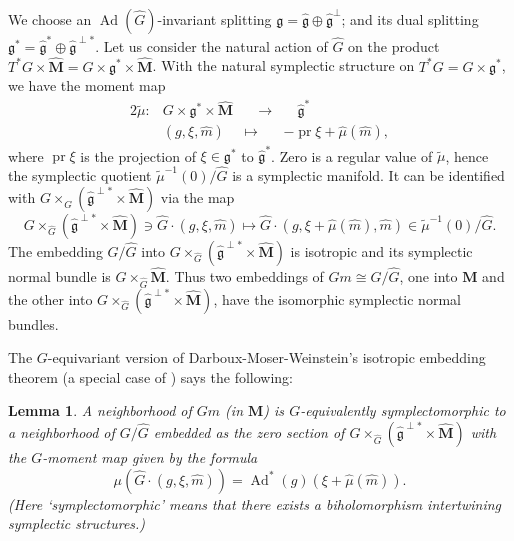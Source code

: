 \documentclass[12pt]{amsart}
\newcommand{\rom}{\textup}
\newtheorem{Lemma}[equation]{Lemma}
\theoremstyle{definition}
\theoremstyle{remark}
\numberwithin{equation}{subsection}
\newcommand{\bM}{{\mathbf M}} %
\begin{document}
We choose an $\operatorname{Ad}(\widehat G)$-invariant splitting
$\mathfrak g = \widehat{\mathfrak g}\oplus
\widehat{\mathfrak g}^\perp$; and its dual splitting 
$\mathfrak g^* = \widehat{\mathfrak g}^*\oplus
\widehat{\mathfrak g}^{\perp*}$.
Let us consider the natural action of $\widehat G$ on the product
$T^*G\times\widehat\bM = G\times\mathfrak g^*\times\widehat\bM$.
%
With the natural symplectic structure on $T^*G = G\times\mathfrak
g^*$, we have the moment map
\begin{alignat*}{2}
  \widetilde\mu\colon & G\times\mathfrak g^*\times\widehat\bM &\quad
   \to &\quad \widehat{\mathfrak g}^* \\
  & (g,\xi,\widehat m) & \mapsto &
   -\operatorname{pr}\xi + \widehat\mu(\widehat m),
\end{alignat*}
where $\operatorname{pr}\xi$ is the projection of
$\xi\in\mathfrak g^*$ to $\widehat{\mathfrak g}^*$.
%
Zero is a regular value of $\widetilde\mu$, hence the symplectic quotient
$\widetilde\mu^{-1}(0)/\widehat G$ is a symplectic manifold. It can be
identified with
\(
   G\times_{\widehat G} \left(
     \widehat{\mathfrak g}^{\perp*}\times \widehat\bM \right)
\)
via the map
\begin{equation*}
  G\times_{\widehat G} \left(
     \widehat{\mathfrak g}^{\perp*}\times \widehat\bM \right) \ni
   \widehat G\cdot(g,\xi, \widehat m)
     \longmapsto
   \widehat G\cdot(g,\xi+\widehat\mu(\widehat m),\widehat m)
   \in \widetilde\mu^{-1}(0)/\widehat G.
\end{equation*}
The embedding $G/\widehat G$ into
\(
   G\times_{\widehat G} \left(
     \widehat{\mathfrak g}^{\perp*}\times \widehat\bM \right)
\)
is isotropic and its symplectic normal bundle is $G\times_{\widehat
G}\widehat\bM$. Thus two embeddings of $Gm\cong G/\widehat G$, one
into $\bM$ and the other into
\(
   G\times_{\widehat G} \left(
     \widehat{\mathfrak g}^{\perp*}\times \widehat\bM \right)
\),
have the isomorphic symplectic normal bundles.

The $G$-equivariant version of Darboux-Moser-Weinstein's isotropic
embedding theorem (a special case of \cite[2.2]{SL}) says the
following:
\begin{Lemma}\label{lem:symplectic}
A neighborhood of $Gm$ \rom(in $\bM$\rom) is $G$-equivalently
symplectomorphic to a neighborhood of $G/\widehat G$ embedded as the
zero section of
%
\(
    G\times_{\widehat G}
      \left( \widehat{\mathfrak g}^{\perp*}\times \widehat\bM \right)
\)
with the $G$-moment map given by the formula
\[
   \mu\left(\widehat G\cdot(g,\xi,\widehat m)\right)
   = \operatorname{Ad}^*(g)\left(\xi + \widehat\mu(\widehat m)\right).
\]
\rom(Here `symplectomorphic' means that there exists a biholomorphism
intertwining symplectic structures.\rom)
\end{Lemma}
\end{document}
